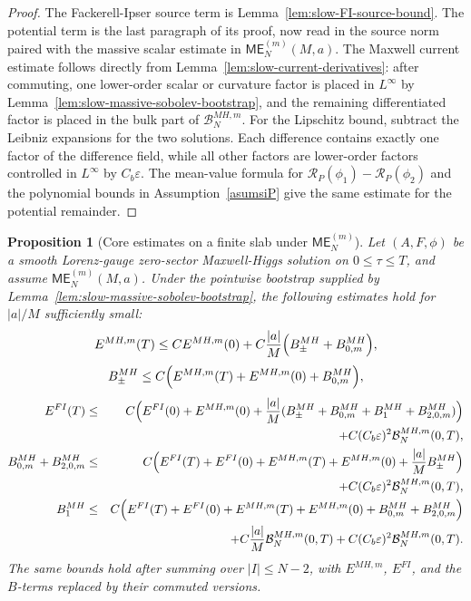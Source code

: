 \documentclass[11pt]{article}
\numberwithin{equation}{section}
\theoremstyle{plain}
\newtheorem{proposition}[theorem]{Proposition}
\theoremstyle{definition}
\theoremstyle{remark}
\newcommand{\ME}{\mathsf{ME}}
\begin{document}
\begin{proof}
The Fackerell-Ipser source term is Lemma~\ref{lem:slow-FI-source-bound}.  The potential term is the last paragraph of its proof, now read in the source norm paired with the massive scalar estimate in \(\ME_N^{(m)}(M,a)\).  The Maxwell current estimate follows directly from Lemma~\ref{lem:slow-current-derivatives}: after commuting, one lower-order scalar or curvature factor is placed in \(L^\infty\) by Lemma~\ref{lem:slow-massive-sobolev-bootstrap}, and the remaining differentiated factor is placed in the bulk part of \(\mathcal B_N^{MH,m}\).  For the Lipschitz bound, subtract the Leibniz expansions for the two solutions.  Each difference contains exactly one factor of the difference field, while all other factors are lower-order factors controlled in \(L^\infty\) by \(C_b\varepsilon\).  The mean-value formula for \(\mathcal R_P(\phi_1)-\mathcal R_P(\phi_2)\) and the polynomial bounds in Assumption~\ref{asumsiP} give the same estimate for the potential remainder.
\end{proof}

\begin{proposition}[Core estimates on a finite slab under \(\ME^{(m)}_N\)]\label{prop:slow-core-estimates-full}
Let \((A,F,\phi)\) be a smooth Lorenz-gauge zero-sector Maxwell-Higgs solution on \(0\le\tau\le T\), and assume \(\ME^{(m)}_N(M,a)\).  Under the pointwise bootstrap supplied by Lemma~\ref{lem:slow-massive-sobolev-bootstrap}, the following estimates hold for \(|a|/M\) sufficiently small:
\begin{equation}\label{eq:slow-core-energy}
E^{MH,m}(T)
\le
C E^{MH,m}(0)+C\frac{|a|}{M}
\Bigl(B_{\pm}^{MH}+B_{0,m}^{MH}\Bigr),
\end{equation}
\begin{equation}\label{eq:slow-core-morawetz}
B_{\pm}^{MH}
\le
C\Bigl(E^{MH,m}(T)+E^{MH,m}(0)+B_{0,m}^{MH}\Bigr),
\end{equation}
\begin{eqnarray}
E^{FI}(T)
&\le&
C\Bigl(E^{FI}(0)+E^{MH,m}(0)
+\frac{|a|}{M}(B_{\pm}^{MH}+B_{0,m}^{MH}+B_1^{MH}+B_{2,0,m}^{MH})\Bigr)
\nonumber\\
&&+C(C_b\varepsilon)^2\mathcal B_N^{MH,m}(0,T),
\label{eq:slow-core-fi}\\
B_{0,m}^{MH}+B_{2,0,m}^{MH}
&\le&
C\Bigl(E^{FI}(T)+E^{FI}(0)+E^{MH,m}(T)+E^{MH,m}(0)
+\frac{|a|}{M}B_{\pm}^{MH}\Bigr)
\nonumber\\
&&+C(C_b\varepsilon)^2\mathcal B_N^{MH,m}(0,T),
\label{eq:slow-core-fi-mor}\\
B_1^{MH}
&\le&
C\Bigl(E^{FI}(T)+E^{FI}(0)+E^{MH,m}(T)+E^{MH,m}(0)
+B_{0,m}^{MH}+B_{2,0,m}^{MH}\Bigr)
\nonumber\\
&&+C\frac{|a|}{M}\mathcal B_N^{MH,m}(0,T)
+C(C_b\varepsilon)^2\mathcal B_N^{MH,m}(0,T).
\label{eq:slow-core-trap}
\end{eqnarray}
The same bounds hold after summing over \(|I|\le N-2\), with \(E^{MH,m}\), \(E^{FI}\), and the \(B\)-terms replaced by their commuted versions.
\end{proposition}
\end{document}
